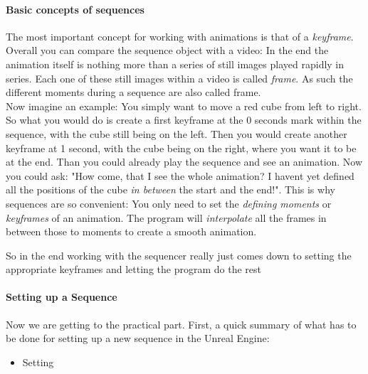 \paragraph{Basic concepts of sequences}

The most important concept for working with animations is that of a \textit{keyframe}. Overall you can compare the sequence object with a video: In the end the animation itself is nothing more than a series of still images played rapidly in series. Each one of these still images within a video is called \textit{frame}. As such the different moments during a sequence are also called frame.\\
Now imagine an example: You simply want to move a red cube from left to right. So what you would do is create a first keyframe at the 0 seconds mark within the sequence, with the cube still being on the left. Then you would create another keyframe at 1 second, with the cube being on the right, where you want it to be at the end. Than you could already play the sequence and see an animation. Now you could ask: "How come, that I see the whole animation? I havent yet defined all the positions of the cube \textit{in between} the start and the end!". This is why sequences are so convenient: You only need to set the \textit{defining moments} or \textit{keyframes} of an animation. The program will \textit{interpolate} all the frames in between those to moments to create a smooth animation.

So in the end working with the sequencer really just comes down to setting the appropriate keyframes and letting the program do the rest

\paragraph{Setting up a Sequence}

Now we are getting to the practical part. First, a quick summary of what has to be done for setting up a new sequence in the Unreal Engine:
\begin{itemize}
\item Setting
\end{itemize}